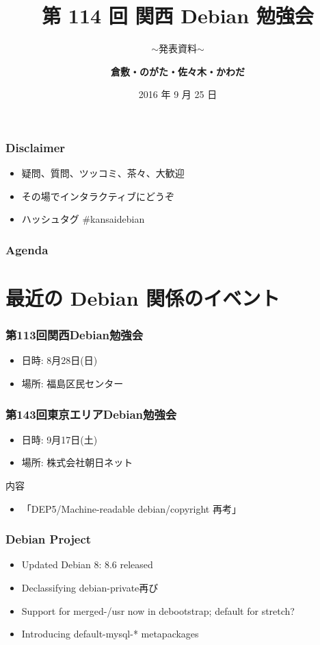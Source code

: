 \documentclass[cjk,dvipdfmx,10pt,compress,%
hyperref={bookmarks=true,bookmarksnumbered=true,bookmarksopen=false,%
colorlinks=false,%
pdftitle={第 114 回 関西 Debian 勉強会},%
pdfauthor={倉敷・のがた・佐々木・かわだ},%
pdfsubject={資料},%
}]{beamer}
\title{第 114 回 関西 Debian 勉強会}
\subtitle{$\sim$発表資料$\sim$}
\author[かわだ てつたろう]{{\large\bf 倉敷・のがた・佐々木・かわだ}}
\institute[Debian JP]{{\normalsize\tt 関西 Debian 勉強会}}
\date{{\small 2016 年 9 月 25 日}}
\begin{document}
\settitleslide
\begin{frame}
\titlepage
\end{frame}
\setdefaultslide

\begin{frame}[fragile]
  \frametitle{Disclaimer}
  \begin{itemize}
  \item 疑問、質問、ツッコミ、茶々、\alert{大歓迎}
  \item その場でインタラクティブにどうぞ
  \item ハッシュタグ \#kansaidebian
  \end{itemize}
\end{frame}

\begin{frame}[fragile]
\frametitle{Agenda}

\tableofcontents

\end{frame}

\section{最近の Debian 関係のイベント}

\begin{frame}[fragile]
  \frametitle{第113回関西Debian勉強会}
  \begin{itemize}
  \item 日時: 8月28日(日)
  \item 場所: 福島区民センター
  \end{itemize}
\end{frame}

\begin{frame}[fragile]
  \frametitle{第143回東京エリアDebian勉強会}
  \begin{itemize}
  \item 日時: 9月17日(土)
  \item 場所: 株式会社朝日ネット
  \end{itemize}
  \begin{block}{内容}
    \begin{itemize}
    \item 「DEP5/Machine-readable debian/copyright 再考」
    \end{itemize}
  \end{block}
\end{frame}

\begin{frame}[fragile]
  \frametitle{Debian Project}
  \begin{itemize}
  \item Updated Debian 8: 8.6 released
  \item Declassifying debian-private再び
  \item Support for merged-/usr now in debootstrap; default for stretch?
  \item Introducing default-mysql-* metapackages
  \end{itemize}
\end{frame}
\end{document}
